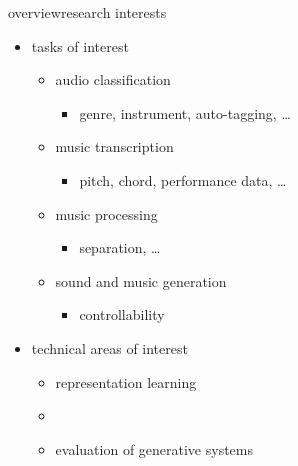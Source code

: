 \begin{frame}{overview}{research interests}
    \begin{itemize}
				\item	tasks of interest
					\begin{itemize}
						\item audio classification 
							\begin{itemize}
								\item genre, instrument, auto-tagging, \ldots
							\end{itemize}
						\smallskip
						\item	music transcription 
							\begin{itemize}
								\item pitch, chord, performance data, \ldots
							\end{itemize}
						\smallskip
						\item	music processing 
							\begin{itemize}
								\item separation, \ldots
							\end{itemize}
						\smallskip
						\item	sound and music generation
							\begin{itemize}
								\item controllability
							\end{itemize}
					\end{itemize}
				\bigskip
				\item<2->	technical areas of interest
					\begin{itemize}
						\item   representation learning
						\smallskip
						\item		{}
						\smallskip
						\item		evaluation of generative systems
					\end{itemize}
    \end{itemize}
    
\end{frame}

